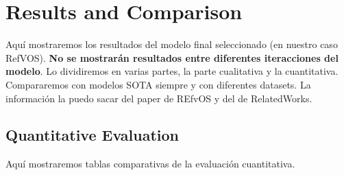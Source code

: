

\chapter{Results and Comparison}\label{cha:results}



\drop Aquí mostraremos los resultados del modelo final seleccionado (en nuestro
caso RefVOS). \textbf{No se mostrarán resultados entre diferentes iteracciones
  del modelo}. Lo dividiremos en varias partes, la parte cualitativa y la
cuantitativa. Compararemos con modelos SOTA siempre y con diferentes
datasets. La información la puedo sacar del paper de REfvOS y del de
RelatedWorks.



\section{Quantitative Evaluation}\label{sec:quantitative-eval}

Aquí mostraremos tablas comparativas de la evaluación cuantitativa.


